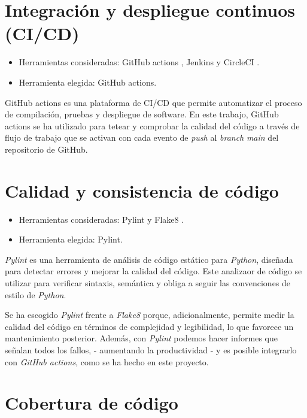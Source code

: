 \section{Integración y despliegue continuos (CI/CD)}\label{ci_cd}

\begin{itemize}
\tightlist
\item
  Herramientas consideradas: GitHub actions \citep{online:github_actions}, Jenkins \citep{online:jenkins} y CircleCI \citep{online:circle_ci}.
\item
  Herramienta elegida: GitHub actions.
\end{itemize}

GitHub actions es una plataforma de CI/CD que permite automatizar el proceso de compilación,
pruebas y despliegue de software. En este trabajo, GitHub actions se ha utilizado para 
tetear y comprobar la calidad del código a través de flujo de trabajo que se activan con 
cada evento de \emph{push} al \emph{branch} \emph{main} del repositorio de GitHub. 


\section{Calidad y consistencia de código}\label{calidad_codigo}

\begin{itemize}
\tightlist
\item
  Herramientas consideradas: Pylint \citep{online:pylint} y Flake8 \citep{online:flake8}.
\item
  Herramienta elegida: Pylint.
\end{itemize}

\emph{Pylint} es una herramienta de análisis de código estático para \emph{Python}, 
diseñada para detectar errores y mejorar la calidad del código. Este analizaor de código se
utilizar para verificar sintaxis, semántica y obliga a seguir las convenciones de estilo
de \emph{Python}. 

Se ha escogido \emph{Pylint} frente a \emph{Flake8} porque, adicionalmente, permite medir la calidad del código en términos de complejidad y legibilidad, lo que favorece un mantenimiento posterior. Además, con \emph{Pylint} podemos hacer informes que señalan todos los fallos, 
- aumentando la productividad - y es posible integrarlo con \emph{GitHub actions}, como se ha hecho en este proyecto.


\section{Cobertura de código}\label{cobertura_codigo}

